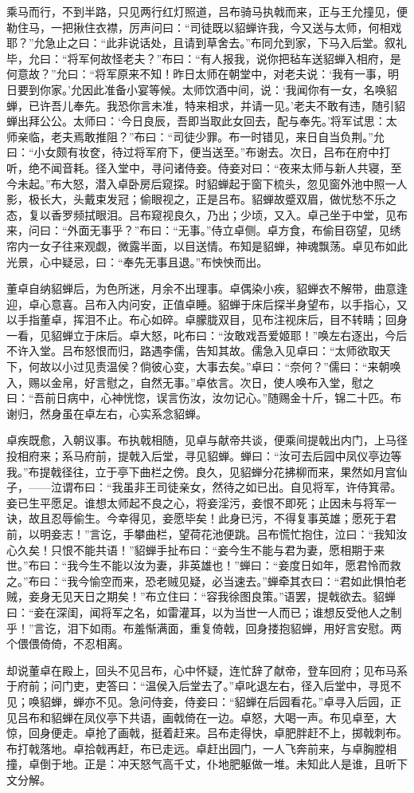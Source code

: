 乘马而行，不到半路，只见两行红灯照道，吕布骑马执戟而来，正与王允撞见，便勒住马，一把揪住衣襟，厉声问曰：“司徒既以貂蝉许我，今又送与太师，何相戏耶？”允急止之曰：“此非说话处，且请到草舍去。”布同允到家，下马入后堂。叙礼毕，允曰：“将军何故怪老夫？”布曰：“有人报我，说你把毡车送貂蝉入相府，是何意故？”允曰：“将军原来不知！昨日太师在朝堂中，对老夫说：‘我有一事，明日要到你家。’允因此准备小宴等候。太师饮酒中间，说：‘我闻你有一女，名唤貂蝉，已许吾儿奉先。我恐你言未准，特来相求，并请一见。’老夫不敢有违，随引貂蝉出拜公公。太师曰：‘今日良辰，吾即当取此女回去，配与奉先。’将军试思：太师亲临，老夫焉敢推阻？”布曰：“司徒少罪。布一时错见，来日自当负荆。”允曰：“小女颇有妆奁，待过将军府下，便当送至。”布谢去。次日，吕布在府中打听，绝不闻音耗。径入堂中，寻问诸侍妾。侍妾对曰：“夜来太师与新人共寝，至今未起。”布大怒，潜入卓卧房后窥探。时貂蝉起于窗下梳头，忽见窗外池中照一人影，极长大，头戴束发冠；偷眼视之，正是吕布。貂蝉故蹙双眉，做忧愁不乐之态，复以香罗频拭眼泪。吕布窥视良久，乃出；少顷，又入。卓己坐于中堂，见布来，问曰：“外面无事乎？”布曰：“无事。”侍立卓侧。卓方食，布偷目窃望，见绣帘内一女子往来观觑，微露半面，以目送情。布知是貂蝉，神魂飘荡。卓见布如此光景，心中疑忌，曰：“奉先无事且退。”布怏怏而出。

董卓自纳貂蝉后，为色所迷，月余不出理事。卓偶染小疾，貂蝉衣不解带，曲意逢迎，卓心意喜。吕布入内问安，正值卓睡。貂蝉于床后探半身望布，以手指心，又以手指董卓，挥泪不止。布心如碎。卓朦胧双目，见布注视床后，目不转睛；回身一看，见貂蝉立于床后。卓大怒，叱布曰：“汝敢戏吾爱姬耶！”唤左右逐出，今后不许入堂。吕布怒恨而归，路遇李儒，告知其故。儒急入见卓曰：“太师欲取天下，何故以小过见责温侯？倘彼心变，大事去矣。”卓曰：“奈何？”儒曰：“来朝唤入，赐以金帛，好言慰之，自然无事。”卓依言。次日，使人唤布入堂，慰之曰：“吾前日病中，心神恍惚，误言伤汝，汝勿记心。”随赐金十斤，锦二十匹。布谢归，然身虽在卓左右，心实系念貂蝉。

卓疾既愈，入朝议事。布执戟相随，见卓与献帝共谈，便乘间提戟出内门，上马径投相府来；系马府前，提戟入后堂，寻见貂蝉。蝉曰：“汝可去后园中凤仪亭边等我。”布提戟径往，立于亭下曲栏之傍。良久，见貂蝉分花拂柳而来，果然如月宫仙子，——泣谓布曰：“我虽非王司徒亲女，然待之如已出。自见将军，许侍箕帚。妾已生平愿足。谁想太师起不良之心，将妾淫污，妾恨不即死；止因未与将军一诀，故且忍辱偷生。今幸得见，妾愿毕矣！此身已污，不得复事英雄；愿死于君前，以明妾志！”言讫，手攀曲栏，望荷花池便跳。吕布慌忙抱住，泣曰：“我知汝心久矣！只恨不能共语！”貂蝉手扯布曰：“妾今生不能与君为妻，愿相期于来世。”布曰：“我今生不能以汝为妻，非英雄也！”蝉曰：“妾度日如年，愿君怜而救之。”布曰：“我今愉空而来，恐老贼见疑，必当速去。”蝉牵其衣曰：“君如此惧怕老贼，妾身无见天日之期矣！”布立住曰：“容我徐图良策。”语罢，提戟欲去。貂蝉曰：“妾在深闺，闻将军之名，如雷灌耳，以为当世一人而已；谁想反受他人之制乎！”言讫，泪下如雨。布羞惭满面，重复倚戟，回身搂抱貂蝉，用好言安慰。两个偎偎倚倚，不忍相离。

却说董卓在殿上，回头不见吕布，心中怀疑，连忙辞了献帝，登车回府；见布马系于府前；问门吏，吏答曰：“温侯入后堂去了。”卓叱退左右，径入后堂中，寻觅不见；唤貂蝉，蝉亦不见。急问侍妾，侍妾曰：“貂蝉在后园看花。”卓寻入后园，正见吕布和貂蝉在凤仪亭下共语，画戟倚在一边。卓怒，大喝一声。布见卓至，大惊，回身便走。卓抢了画戟，挺着赶来。吕布走得快，卓肥胖赶不上，掷戟刺布。布打戟落地。卓拾戟再赶，布已走远。卓赶出园门，一人飞奔前来，与卓胸膛相撞，卓倒于地。正是：冲天怒气高千丈，仆地肥躯做一堆。未知此人是谁，且听下文分解。